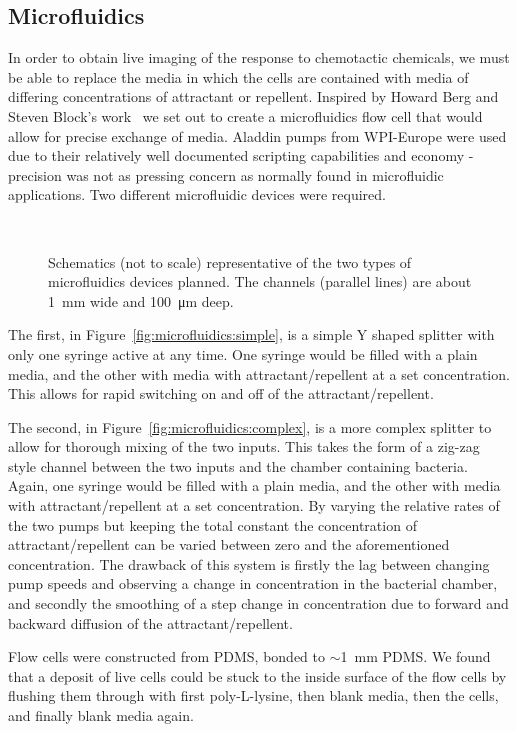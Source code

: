 \documentclass[../main.tex]{subfiles}
\begin{document}
\subsection{Microfluidics}

In order to obtain live imaging of the response to chemotactic chemicals, we must be able to replace the media in which the cells are contained with media of differing concentrations of attractant or repellent. Inspired by Howard Berg and Steven Block's work~\citep{berg84} we set out to create a microfluidics flow cell that would allow for precise exchange of media. Aladdin pumps from WPI-Europe were used due to their relatively well documented scripting capabilities and economy - precision was not as pressing concern as normally found in microfluidic applications. Two different microfluidic devices were required.

\begin{figure}[h!]
\begin{center}
\\
\caption[Microfluidics devices]{Schematics (not to scale) representative of the two types of microfluidics devices planned. The channels (parallel lines) are about \SI{1}{\milli\meter} wide and \SI{100}{\micro\meter} deep.}
\label{fig:microfluidics}
\end{center}
\end{figure}

The first, in Figure~\ref{fig:microfluidics:simple}, is a simple Y shaped splitter with only one syringe active at any time. One syringe would be filled with a plain media, and the other with media with attractant/repellent at a set concentration. This allows for rapid switching on and off of the attractant/repellent.

The second, in Figure~\ref{fig:microfluidics:complex}, is a more complex splitter to allow for thorough mixing of the two inputs. This takes the form of a zig-zag style channel between the two inputs and the chamber containing bacteria. Again, one syringe would be filled with a plain media, and the other with media with attractant/repellent at a set concentration. By varying the relative rates of the two pumps but keeping the total constant the concentration of attractant/repellent can be varied between zero and the aforementioned concentration. The drawback of this system is firstly the lag between changing pump speeds and observing a change in concentration in the bacterial chamber, and secondly the smoothing of a step change in concentration due to forward and backward diffusion of the attractant/repellent.

Flow cells were constructed from PDMS, bonded to \(\sim\)\SI{1}{\milli\meter} PDMS. We found that a deposit of live cells could be stuck to the inside surface of the flow cells by flushing them through with first poly-L-lysine, then blank media, then the cells, and finally blank media again.
\end{document}
